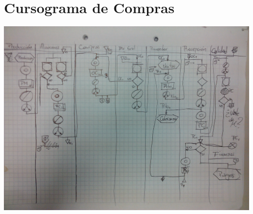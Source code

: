 \pagebreak
\section{Cursograma de Compras}
\includegraphics [scale=0.22 ,angle=90]{Empresa/Circuitos/Compras/Compras-v2.jpg}

\pagebreak
